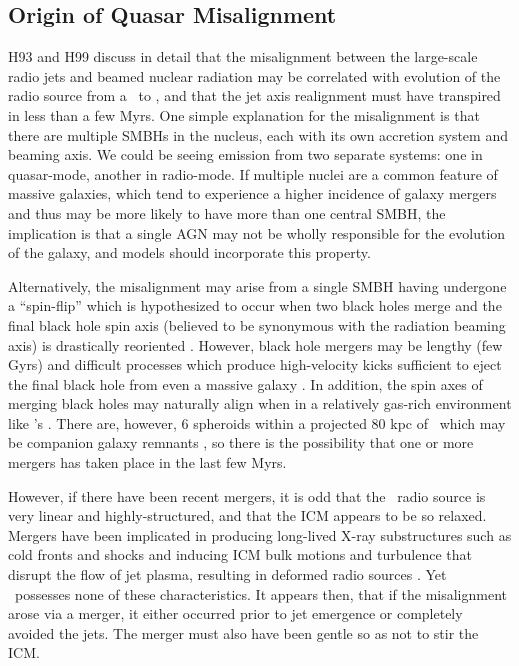 \documentclass[useAMS,usenatbib]{mn2e}
\begin{document}
\subsection{Origin of Quasar Misalignment}

H93 and H99 discuss in detail that the misalignment between the
large-scale radio jets and beamed nuclear radiation may be correlated
with evolution of the radio source from a \frii\ to \fri, and that the
jet axis realignment must have transpired in less than a few Myrs. One
simple explanation for the misalignment is that there are multiple
SMBHs in the nucleus, each with its own accretion system and beaming
axis. We could be seeing emission from two separate systems: one in
quasar-mode, another in radio-mode. If multiple nuclei are a common
feature of massive galaxies, which tend to experience a higher
incidence of galaxy mergers and thus may be more likely to have more
than one central SMBH, the implication is that a single AGN may not be
wholly responsible for the evolution of the galaxy, and models should
incorporate this property.

Alternatively, the misalignment may arise from a single SMBH having
undergone a ``spin-flip'' \citep{2002Sci...297.1310M} which is
hypothesized to occur when two black holes merge and the final black
hole spin axis (believed to be synonymous with the radiation beaming
axis) is drastically reoriented
\citep[\eg][]{2010ApJ...717L..37H}. However, black hole mergers may be
lengthy (few Gyrs) and difficult processes which produce high-velocity
kicks sufficient to eject the final black hole from even a massive
galaxy \citep[\eg][]{2007ApJ...659L...5C}. In addition, the spin axes
of merging black holes may naturally align when in a relatively
gas-rich environment like \irs's \citep{2007ApJ...661L.147B}. There
are, however, 6 spheroids within a projected 80 kpc of \irs\ which may
be companion galaxy remnants \citep{1996AJ....111..649S,
  1999Ap&SS.266..113A}, so there is the possibility that one or more
mergers has taken place in the last few Myrs.

However, if there have been recent mergers, it is odd that the
\irs\ radio source is very linear and highly-structured, and that the
ICM appears to be so relaxed. Mergers have been implicated in
producing long-lived X-ray substructures such as cold fronts and
shocks \citep[see][for a review]{2007PhR...443....1M} and inducing ICM
bulk motions and turbulence that disrupt the flow of jet plasma,
resulting in deformed radio sources \citep[\eg][]{2009A&A...495..721S,
  2010arXiv1002.0395S}. Yet \irs\ possesses none of these
characteristics. It appears then, that if the misalignment arose via a
merger, it either occurred prior to jet emergence or completely avoided
the jets. The merger must also have been gentle so as not to stir the
ICM.
\end{document}

